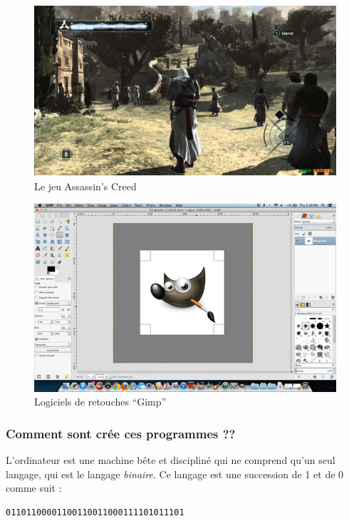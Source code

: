 \documentclass[12pt]{article}
\begin{document}
            \begin{figure}[H]
                \centering
                \includegraphics[width=\textwidth, height=2.5in]{img/3_assassins_creed.jpg}
                \caption{Le jeu Assassin's Creed}
            \end{figure}
            \begin{figure}[H]
                \centering
                \includegraphics[width=\textwidth]{img/4_gimp.png}
                \caption{Logiciels de retouches ``Gimp''}
            \end{figure}

        \subsubsection{Comment sont crée ces programmes ??}
            L'ordinateur est une machine bête et discipliné qui ne comprend qu'un seul langage, qui est le langage
            \emph{binaire}. Ce langage est une succession de 1 et de 0 comme suit :
            \begin{lstlisting}[style=code,numbers=none]
01101100001100110011000111101011101
            \end{lstlisting}
\end{document}
